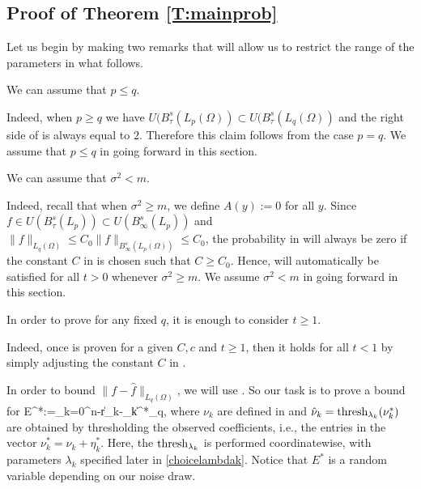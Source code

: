  \subsection{Proof of   Theorem \ref{T:mainprob}}
\label{SS:ub1}
 Let us begin by making two remarks that will allow us to restrict the range of the parameters in what follows.

 \begin{remark} 
 \label{R:p<q}
 We can assume that $p\le q$.
 \end{remark}
    Indeed, when $p\ge q$ we have $U(B_\tau^s(L_p(\Omega)) \subset U(B_\tau^s(L_q(\Omega))$ and the right side of  is  always equal to $2$. Therefore  this claim follows from the case $p=q$.  We assume that $p\le q$ in going forward in this section.

 \begin{remark} 
 \label{R:sigma}
 We can assume that $\sigma^2 < m $.
 \end{remark}
 Indeed, recall that when $\sigma^2\ge m$, we define $A(y):=0$ for all $y$. Since $f\in U(B^s_\tau(L_p))\subset U(B^s_\infty (L_p))$ and $\|f\|_{L_q(\Omega)}\le C_0\|f\|_{B_\infty^s(L_p(\Omega))}\leq C_0$, the probability in  will
 always be zero if the  constant $C$ in  is chosen such that   $C\geq C_0$.  Hence,  will automatically be satisfied for all $t>0$ whenever $\sigma^2\ge m$.
 We assume $\sigma^2<m$ in going forward in this section.

 \begin{remark} 
 \label{R:t}
 In order  to prove   for any fixed $q$,  it is enough to consider $t\ge 1$.
 \end{remark}
 Indeed, once  is proven for a given $C,c$ %
  and $t\ge 1$, then it holds for all $t< 1$ by simply adjusting the constant $C$ in .

  \bigskip
 In order to bound $\|f-\hat f\|_{L_q(\Omega)}$,  we will use . So our task is to prove  a bound for
 \be 
 \label{want11}
 E^*:=\sum_{k=0}^{n-r}\|\nu_k-\hat \nu_k\|^*_q,
\ee
where $\nu_k$
are defined in  and $\hat \nu_k={\rm thresh}_{\lambda_k}(\nu_k^*)$ are  obtained by thresholding the observed coefficients, i.e., the entries in the vector $\nu_k^*=\nu_k+\eta^*_k$.  Here,  the ${ \rm thresh}_{\lambda_k}$ is performed coordinatewise, with parameters $\lambda_k$ specified later in \eqref{choicelambdak}. Notice that $E^*$ is a random variable depending on our noise draw. 



